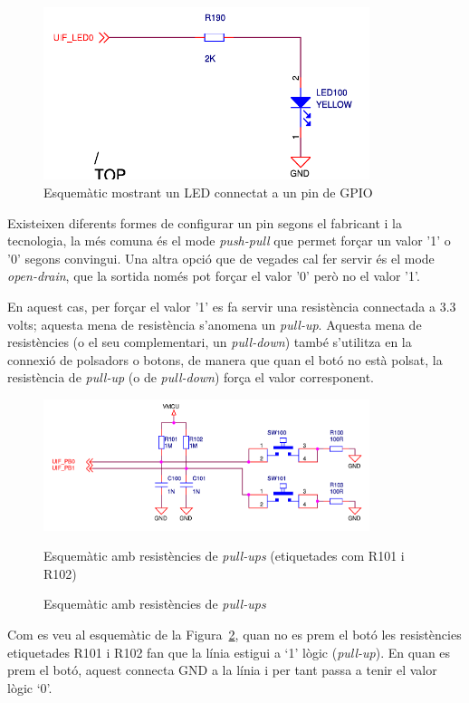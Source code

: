 \begin{figure}
 \centering
 \includegraphics[width=0.85\textwidth, keepaspectratio]{imatges/led.png}
 \caption{Esquemàtic mostrant un LED connectat a un pin de GPIO}
 \label{fig:led}
\end{figure}

Existeixen diferents formes de configurar un pin segons el fabricant i la tecnologia, la més comuna és el mode {\em push-pull} que permet forçar un valor '1' o '0' segons convingui. Una altra opció que de vegades cal fer servir és el mode {\em open-drain}, que la sortida només pot forçar el valor '0' però no el valor '1'.

En aquest cas, per forçar el valor '1' es fa servir una resistència connectada a 3.3 volts; aquesta mena de resistència s'anomena un {\em \gls{pull-up}}. Aquesta mena de resistències (o el seu complementari, un {\em \gls{pull-down}}) també s'utilitza en la connexió de polsadors o botons, de manera que quan el botó no està polsat, la resistència de {\em pull-up} (o de {\em pull-down}) força el valor corresponent.

\begin{figure}
 \centering
 \includegraphics[width=0.85\textwidth, keepaspectratio]{imatges/buttons.png}
 \caption{Esquemàtic amb resistències de {\em pull-ups}}{Esquemàtic amb resistències de {\em pull-ups} (etiquetades com R101 i R102)}
 \label{fig:pullup}
\end{figure}

Com es veu al esquemàtic de la Figura~\ref{fig:pullup}, quan no es prem el botó les resistències etiquetades R101 i R102 fan que la línia estigui a ‘1' lògic ({\em pull-up}). En quan es prem el botó, aquest connecta GND a la línia i per tant passa a tenir el valor lògic ‘0'.

